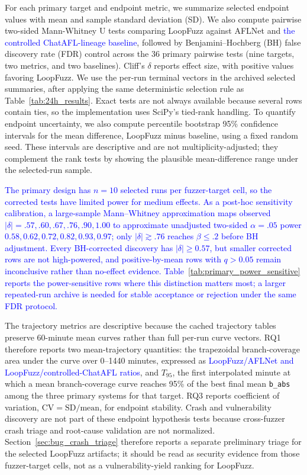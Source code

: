 \documentclass[final,5p,times,number]{elsarticle}
\begin{document}
For each primary target and endpoint metric, we summarize selected endpoint values with mean and sample standard deviation (SD). We also compute pairwise two-sided Mann-Whitney U tests comparing LoopFuzz against AFLNet and \textcolor{blue}{the controlled ChatAFL-lineage baseline}, followed by Benjamini--Hochberg (BH) false discovery rate (FDR) control across the 36 primary pairwise tests (nine targets, two metrics, and two baselines). Cliff's $\delta$ reports effect size, with positive values favoring LoopFuzz. We use the per-run terminal vectors in the archived selected summaries, after applying the same deterministic selection rule as Table~\ref{tab:24h_results}. Exact tests are not always available because several rows contain ties, so the implementation uses SciPy's tied-rank handling. To quantify endpoint uncertainty, we also compute percentile bootstrap 95\% confidence intervals for the mean difference, LoopFuzz minus baseline, using a fixed random seed. These intervals are descriptive and are not multiplicity-adjusted; they complement the rank tests by showing the plausible mean-difference range under the selected-run sample.

\textcolor{blue}{The primary design has $n=10$ selected runs per fuzzer-target cell, so the corrected tests have limited power for medium effects. As a post-hoc sensitivity calibration, a large-sample Mann--Whitney approximation maps observed $|\delta|=.57,.60,.67,.76,.90,1.00$ to approximate unadjusted two-sided $\alpha=.05$ power $0.58,0.62,0.72,0.82,0.93,0.97$; only $|\delta|\gtrsim.76$ reaches $\beta\le.2$ before BH adjustment. Every BH-corrected discovery has $|\delta|\ge0.57$, but smaller corrected rows are not high-powered, and positive-by-mean rows with $q>0.05$ remain inconclusive rather than no-effect evidence. Table~\ref{tab:primary_power_sensitive} reports the power-sensitive rows where this distinction matters most; a larger repeated-run archive is needed for stable acceptance or rejection under the same FDR protocol.}

The trajectory metrics are descriptive because the cached trajectory tables preserve 60-minute mean curves rather than full per-run curve vectors. RQ1 therefore reports two mean-trajectory quantities: the trapezoidal branch-coverage area under the curve over 0--1440 minutes, expressed as \textcolor{blue}{LoopFuzz/AFLNet and LoopFuzz/controlled-ChatAFL ratios}, and $T_{95}$, the first interpolated minute at which a mean branch-coverage curve reaches 95\% of the best final mean \texttt{b\_abs} among the three primary systems for that target. RQ3 reports coefficient of variation, $\mathrm{CV}=\mathrm{SD}/\mathrm{mean}$, for endpoint stability. Crash and vulnerability discovery are not part of these endpoint hypothesis tests because cross-fuzzer crash triage and root-cause validation are not normalized. Section~\ref{sec:bug_crash_triage} therefore reports a separate preliminary triage for the selected LoopFuzz artifacts; it should be read as security evidence from those fuzzer-target cells, not as a vulnerability-yield ranking for LoopFuzz.
\end{document}
